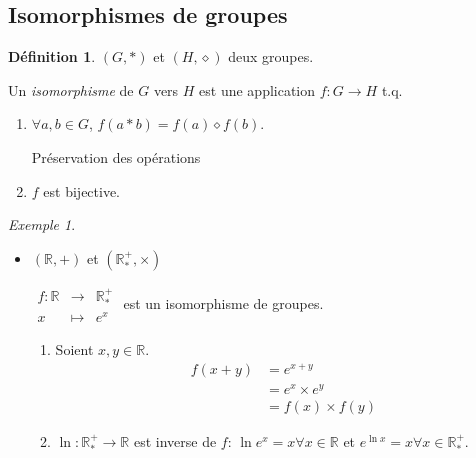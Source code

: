 \documentclass{report}
\newcommand*{\reels}{\mathbb{R}}
\theoremstyle{definition}
\newtheorem*{defin}{D\'efinition}
\theoremstyle{remark}
\newtheorem*{exem}{Exemple}
\begin{document}
	\subsection{Isomorphismes de groupes}
	\begin{defin}
		$(G,*)$ et $(H,\diamond)$ deux groupes.

		Un \emph{isomorphisme} de $G$ vers $H$ est une application $f:G \to H$ t.q.
		\begin{enumerate}[noitemsep]
			\item $\forall a,b \in G$, $f(a*b)=f(a)\diamond f(b)$.

			Pr\'eservation des op\'erations
			\item $f$ est bijective.
		\end{enumerate}
	\end{defin}
	\begin{exem}~

		\begin{itemize}
			\item $(\reels,+)$ et $(\reels^+_*,\times)$

			$\begin{array}{rcl}
				f:\reels&\to&\reels^+_*\\
				x&\mapsto&e^x
			\end{array}$ est un isomorphisme de groupes.
			\begin{enumerate}[label=(\arabic*)]
				\item Soient $x,y \in \reels$.
				\begin{align*}
					f(x+y)&= e^{x+y}\\
					&= e^x \times e^y\\
					&= f(x) \times f(y)
				\end{align*}
				\item $\ln:\reels^+_* \to \reels$ est inverse de $f$: $\ln e^x=x \forall x \in \reels$ et $e^{\ln x}=x \forall x \in \reels^+_*$.
			\end{enumerate}
		\end{itemize}
	\end{exem}
\end{document}

